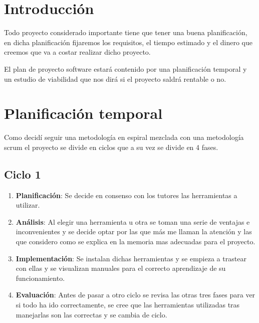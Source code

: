 
\section{Introducción}

Todo proyecto considerado importante tiene que tener una buena planificación, en dicha planificación fijaremos los requisitos, el tiempo estimado y el dinero que creemos que va a costar realizar dicho proyecto.

El plan de proyecto software estará contenido por una planificación temporal y un estudio de viabilidad que nos dirá si el proyecto saldrá rentable o no.

\section{Planificación temporal}

Como decidí seguir una metodología en espiral \cite{ModeloenEspiral} mezclada con una metodología scrum \cite{MetodologiaScrum} el proyecto se divide en ciclos que a su vez se divide en 4 fases. 


\subsection{Ciclo 1}

	\begin{enumerate}
		\item \textbf{Planificación}: Se decide en consenso con los tutores las herramientas a utilizar.
		\item \textbf{Análisis}: Al elegir una herramienta u otra se toman una serie de ventajas e inconvenientes y se decide optar por las que más me llaman la atención y las que considero como se explica en la memoria mas adecuadas para el proyecto.
		\item \textbf{Implementación}: Se instalan dichas herramientas y se empieza a trastear con ellas y se visualizan manuales para el correcto aprendizaje de su funcionamiento.
		\item \textbf{Evaluación}: Antes de pasar a otro ciclo se revisa las otras tres fases para ver si todo ha ido correctamente, se cree que las herramientas utilizadas tras manejarlas son las correctas y se cambia de ciclo.
	\end{enumerate}


